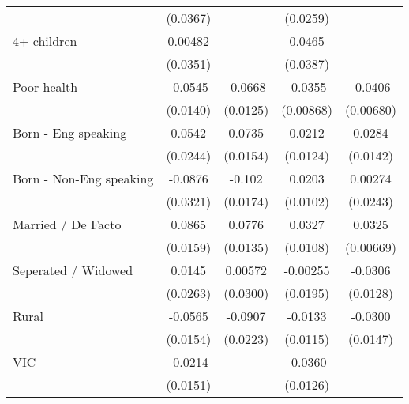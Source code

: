 {\begin{tabular}{l*{4}{c}}
                    &    (0.0367)         &                     &    (0.0259)         &                     \\
[1em]
4+ children         &     0.00482         &                     &      0.0465         &                     \\
                    &    (0.0351)         &                     &    (0.0387)         &                     \\
[1em]
Poor health         &     -0.0545\sym{***}&     -0.0668\sym{***}&     -0.0355\sym{***}&     -0.0406\sym{***}\\
                    &    (0.0140)         &    (0.0125)         &   (0.00868)         &   (0.00680)         \\
[1em]
Born - Eng speaking &      0.0542\sym{*}  &      0.0735\sym{***}&      0.0212         &      0.0284\sym{*}  \\
                    &    (0.0244)         &    (0.0154)         &    (0.0124)         &    (0.0142)         \\
[1em]
Born - Non-Eng speaking&     -0.0876\sym{**} &      -0.102\sym{***}&      0.0203\sym{*}  &     0.00274         \\
                    &    (0.0321)         &    (0.0174)         &    (0.0102)         &    (0.0243)         \\
[1em]
Married / De Facto  &      0.0865\sym{***}&      0.0776\sym{***}&      0.0327\sym{**} &      0.0325\sym{***}\\
                    &    (0.0159)         &    (0.0135)         &    (0.0108)         &   (0.00669)         \\
[1em]
Seperated / Widowed &      0.0145         &     0.00572         &    -0.00255         &     -0.0306\sym{*}  \\
                    &    (0.0263)         &    (0.0300)         &    (0.0195)         &    (0.0128)         \\
[1em]
Rural               &     -0.0565\sym{***}&     -0.0907\sym{***}&     -0.0133         &     -0.0300\sym{*}  \\
                    &    (0.0154)         &    (0.0223)         &    (0.0115)         &    (0.0147)         \\
[1em]
VIC                 &     -0.0214         &                     &     -0.0360\sym{**} &                     \\
                    &    (0.0151)         &                     &    (0.0126)         &                     \\

\end{tabular}}
